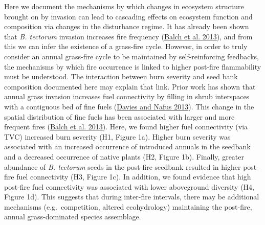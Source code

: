 \documentclass[
  12pt,
]{article}
\begin{document}
Here we document the mechanisms by which changes in ecosystem structure
brought on by invasion can lead to cascading effects on ecosystem
function and composition via changes in the disturbance regime. It has
already been shown that \emph{B. tectorum} invasion increases fire
frequency (\protect\hyperlink{ref-Balch2013}{Balch et al. 2013}), and
from this we can infer the existence of a grass-fire cycle. However, in
order to truly consider an annual grass-fire cycle to be maintained by
self-reinforcing feedbacks, the mechanisms by which fire occurrence is
linked to higher post-fire flammability must be understood. The
interaction between burn severity and seed bank composition documented
here may explain that link. Prior work has shown that annual grass
invasion increases fuel connectivity by filling in shrub interspaces
with a contiguous bed of fine fuels
(\protect\hyperlink{ref-Davies2013}{Davies and Nafus 2013}). This change
in the spatial distribution of fine fuels has been associated with
larger and more frequent fires (\protect\hyperlink{ref-Balch2013}{Balch
et al. 2013}). Here, we found higher fuel connectivity (via TVC)
increased burn severity (H1, Figure 1a). Higher burn severity was
associated with an increased occurrence of introduced annuals in the
seedbank and a decreased occurrence of native plants (H2, Figure 1b).
Finally, greater abundance of \emph{B. tectorum} seeds in the post-fire
seedbank resulted in higher post-fire fuel connectivity (H3, Figure 1c).
In addition, we found evidence that high post-fire fuel connectivity was
associated with lower aboveground diversity (H4, Figure 1d). This
suggests that during inter-fire intervals, there may be additional
mechanisms (e.g.~competition, altered ecohydrology) maintaining the
post-fire, annual grass-dominated species assemblage.
\end{document}
